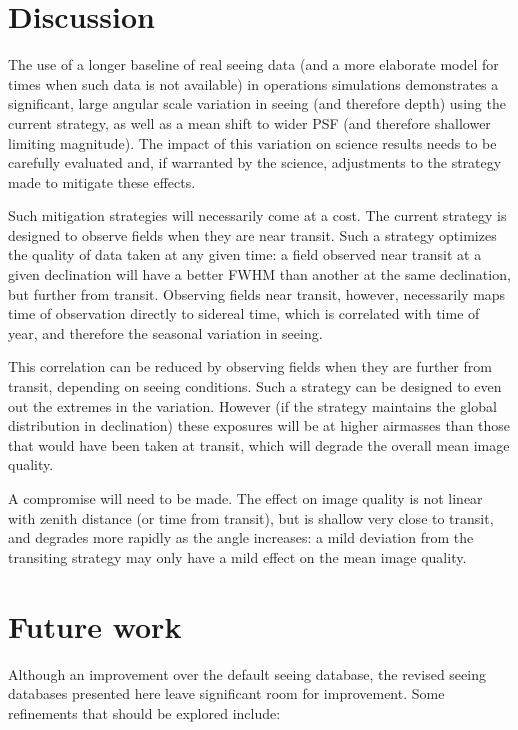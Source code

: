 \documentclass[\docopts]{\docclass}
\begin{document}

\section{Discussion}
\label{sec:discussion}

The use of a longer baseline of real seeing data (and a more elaborate
model for times when such data is not available) in operations
simulations demonstrates a significant, large angular scale variation
in seeing (and therefore depth) using the current strategy, as well as
a mean shift to wider PSF (and therefore shallower limiting
magnitude). The impact of this variation on science results needs to
be carefully evaluated and, if warranted by the science, adjustments
to the strategy made to mitigate these effects.

Such mitigation strategies will necessarily come at a cost. The
current strategy is designed to observe fields when they are near
transit. Such a strategy optimizes the quality of data taken at any
given time: a field observed near transit at a given declination will
have a better FWHM than another at the same declination, but further
from transit. Observing fields near transit, however, necessarily maps
time of observation directly to sidereal time, which is correlated
with time of year, and therefore the seasonal variation in seeing.

This correlation can be reduced by observing fields when they are
further from transit, depending on seeing conditions. Such a strategy
can be designed to even out the extremes in the variation. However (if
the strategy maintains the global distribution in declination) these
exposures will be at higher airmasses than those that would have been
taken at transit, which will degrade the overall mean image quality.

A compromise will need to be made. The effect on image quality is not
linear with zenith distance (or time from transit), but is shallow
very close to transit, and degrades more rapidly as the angle
increases: a mild deviation from the transiting strategy may only have
a mild effect on the mean image quality.

\section{Future work}
\label{sec:future}

Although an improvement over the default seeing database, the revised
seeing databases presented here leave significant room for
improvement. Some refinements that should be explored include:
\end{document}
